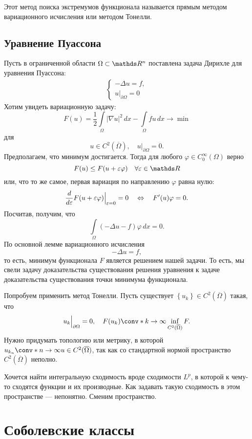 Этот метод поиска экстремумов функционала называется прямым методом вариационного исчисления или методом Тонелли.

\subsection{Уравнение Пуассона}

Пусть в ограниченной области $\Omega \subset \real^n$ поставлена задача Дирихле для уравнения Пуассона:
\begin{align*}
	\begin{cases*}
		- \Delta u =f, \\
		u\Big\rvert_{\partial \Omega} = 0
	\end{cases*}
\end{align*} 
Хотим увидеть вариационную задачу:
$$ F(u) = \frac {1} {2} \int \limits_\Omega | \nabla u |^2 \, dx - \int \limits_\Omega fu \, dx \rightarrow \min$$ для
$$ u \in C^2(\overline{\Omega}), \quad u\Big\rvert_{\partial \Omega}=0.$$
Предполагаем, что минимум достигается. Тогда для любого $\varphi \in C_0^\infty (\Omega)$ верно
$$F(u) \leq F(u + \eps \varphi) \quad \forall \eps \in \real$$
или, что то же самое, первая вариация по направлению $\varphi$ равна нулю:
$$ \frac {d} {d \varepsilon} F(u + \varepsilon \varphi)\Big\rvert_{\varepsilon=0} = 0 \quad \Leftrightarrow \quad F'(u) \varphi = 0.$$
Посчитав, получим, что $$ \int \limits_\Omega (- \Delta u - f) \varphi \, dx = 0.$$
По основной лемме вариационного исчисления
$$ - \Delta u = f,$$
то есть, минимум функционала $F$ является решением нашей задачи. То есть, мы свели задачу доказательства существования решения уравнения к задаче доказательства существования точки минимума функционала.

Попробуем применить метод Тонелли. Пусть существует $\left\{ u_k \right\} \in C^2(\overline{\Omega})$ такая, что
$$ u_k\Big\rvert_{\partial \Omega} = 0, \quad F(u_k) \conv* {} {k \to \infty} \inf_{C^2(\overline{\Omega})} F.$$
Нужно придумать топологию или метрику, в которой $u_{k_n} \conv*{}{n \to \infty} u \in C^2(\overline{\Omega})$, так как со стандартной нормой пространство $C^2(\overline{\Omega})$ неполно.

Хочется найти интегральную сходимость вроде сходимости $L^p$, в которой к чему-то сходятся функции и их производные. Как задавать такую сходимость в этом пространстве --- непонятно. Сменим пространство.

\section{Соболевcкие классы}

